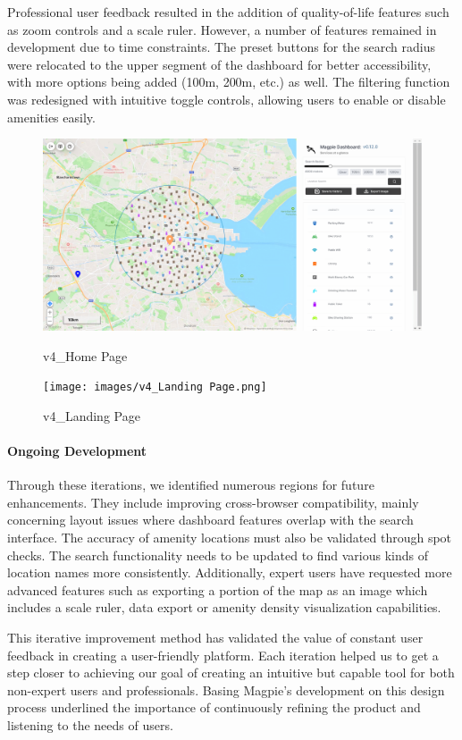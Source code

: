 Professional user feedback resulted in the addition of quality-of-life features
such as zoom controls and a scale ruler. However, a number of features remained in 
development due to time constraints. The preset buttons for the search radius were 
relocated to the upper segment of the dashboard for better accessibility, with more 
options being added (100m, 200m, etc.) as well. The filtering function was redesigned 
with intuitive toggle controls, allowing users to enable or disable amenities easily.

\begin{figure}[htbp]
    \centering
    \begin{minipage}{0.48\textwidth}
        \centering
        \includegraphics[width=\textwidth]{images/v4_Home.png}
        \caption{v4\_Home Page}
        \label{fig:v4_Home Page}
    \end{minipage}
    \hfill
    \begin{minipage}{0.48\textwidth}
        \centering
        \texttt{[image: images/v4\_Landing Page.png]}
        \caption{v4\_Landing Page}
        \label{fig:v4_Landing Page}
    \end{minipage}
\end{figure}

\paragraph{Ongoing Development}

Through these iterations, we identified numerous regions for future
enhancements. They include improving cross-browser compatibility, mainly
concerning layout issues where dashboard features overlap with the search
interface. The accuracy of amenity locations must also be validated through spot
checks. The search functionality needs to be updated to find various kinds of
location names more consistently. Additionally, expert users have requested more
advanced features such as exporting a portion of the map as an image which
includes a scale ruler, data export or amenity density visualization
capabilities.

This iterative improvement method has validated the value of constant user
feedback in creating a user-friendly platform. Each iteration helped us to get a
step closer to achieving our goal of creating an intuitive but capable tool for
both non-expert users and professionals. Basing Magpie's development on this
design process underlined the importance of continuously refining the product
and listening to the needs of users.
